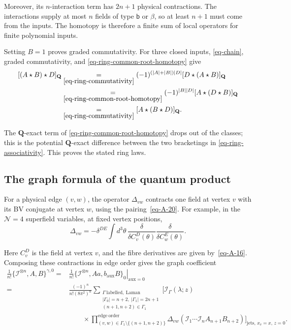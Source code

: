\documentclass[11pt]{article}
\numberwithin{equation}{section}
\numberwithin{figure}{section}
\numberwithin{table}{section}
\begin{document}
Moreover, its $n$-interaction term has $2n+1$ physical contractions. The interactions supply at most $n$ fields of type $\mathsf b$ or $\beta$, so at least $n+1$ must come from the inputs. The homotopy is therefore a finite sum of local operators for finite polynomial inputs.

Setting $B=1$ proves graded commutativity. For three closed inputs, \eqref{eq-chain}, graded commutativity, and \eqref{eq-ring-common-root-homotopy} give
\begin{equation}\label{eq-ring-associativity-proof}
\begin{aligned}
[(A\star B)\star D]_{\mathbf Q}
&\underset{\eqref{eq-ring-commutativity}}{=}(-1)^{(|A|+|B|)|D|}[D\star(A\star B)]_{\mathbf Q}\\
&\underset{\eqref{eq-ring-common-root-homotopy}}{=}(-1)^{|B||D|}[A\star(D\star B)]_{\mathbf Q}\\
&\underset{\eqref{eq-ring-commutativity}}{=}[A\star(B\star D)]_{\mathbf Q}.
\end{aligned}
\end{equation}

The $\mathbf Q$-exact term of \eqref{eq-ring-common-root-homotopy} drops out of the classes; this is the potential $\mathbf Q$-exact difference between the two bracketings in \eqref{eq-ring-associativity}. This proves the stated ring laws.~\hfill\qedsymbol

\subsection{The graph formula of the quantum product}\label{the-graph-formula}

For a physical edge $(v,w)$, the operator $\Delta_{vw}$ contracts one field at vertex $v$ with its BV conjugate at vertex $w$, using the pairing~\eqref{eq-A-20}. For example, in the $\mathcal N=4$ superfield variables, at fixed vertex positions,
\begin{equation*}
\Delta_{vw}=-\delta^{DE}\int d^3\theta\,
\frac{\delta}{\delta C_v^D(\theta)}
\frac{\delta}{\delta C_w^E(\theta)}.
\end{equation*}

Here $C_v^D$ is the field at vertex $v$, and the fibre derivatives are given by~\eqref{eq-A-16}. Composing these contractions in edge order gives the graph coefficient
\begin{equation}\label{eq-2-31}
\begin{aligned}
\frac1{n!}\{\mathcal I^{\otimes n},A,B\}^{\gamma,0}
={}&\left.\frac1{n!}\{\mathcal I^{\otimes n},Aa,b_{\mathrm{aux}}B\}_0\right|_{\mathrm{aux}=0}\\
={}&\frac{(-1)^n}{n!(8\pi^2)^n}
\sum_{\substack{\Gamma\ \mathrm{labelled,\ Laman}\\
|\Gamma_0|=n+2,\ |\Gamma_1|=2n+1\\(n+1,n+2)\in\Gamma_1}}
\Bigg[\mathcal I_\Gamma(\lambda;z)\\
&\qquad\times\prod_{(v,w)\in\Gamma_1\setminus\{(n+1,n+2)\}}^{\mathrm{edge\ order}}
\Delta_{vw}(\mathcal I_1\cdots\mathcal I_nA_{n+1}B_{n+2})\Bigg]_{\mathrm{jets},\,x_v=x,\,z=0}.
\end{aligned}
\end{equation}
\end{document}
